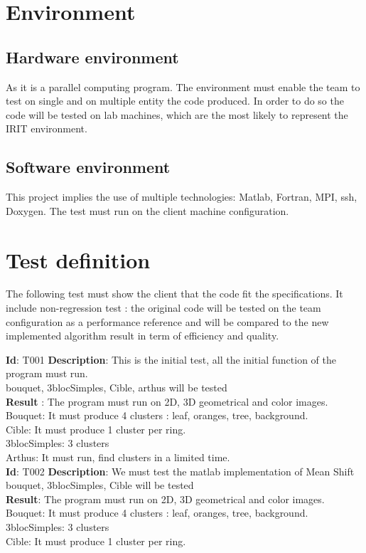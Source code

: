 \section{Environment}
\subsection{Hardware environment}
As it is a parallel computing program. The environment must enable the team to test on single and on multiple entity the code produced. In order to do so the code will be tested on lab machines, which are the most likely to represent the IRIT environment. 
\subsection{Software environment}
This project implies the use of multiple technologies: Matlab, Fortran, MPI, ssh, Doxygen. The test must run on the client machine configuration.

\section{Test definition}
The following test must show the client that the code fit the specifications. It include non-regression test : the original code will be tested on the team configuration as a performance reference and will be compared to the new implemented algorithm result in term of efficiency and quality.

\textbf{Id}: T001
\textbf{Description}: This is the initial test, all the initial function of the program must run. \\
bouquet, 3blocSimples, Cible, arthus will be tested\\
\textbf{Result} : The program must run on 2D, 3D geometrical and color images. \\
Bouquet: It must produce 4 clusters : leaf, oranges, tree, background.\\
Cible: It must produce 1 cluster per ring.\\
3blocSimples: 3 clusters\\
Arthus: It must run, find clusters in a limited time.\\

\textbf{Id}: T002
\textbf{Description}: We must test the matlab implementation of Mean Shift \\
bouquet, 3blocSimples, Cible will be tested\\
\textbf{Result}: The program must run on 2D, 3D geometrical and color images. \\
Bouquet: It must produce 4 clusters : leaf, oranges, tree, background.\\
3blocSimples: 3 clusters\\
Cible: It must produce 1 cluster per ring.\\

